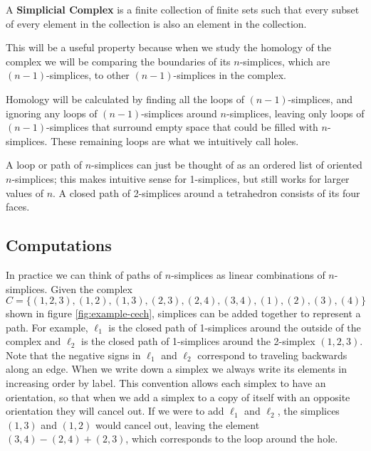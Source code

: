 \begin{definition}\label{def:simplicial-complex}
    A \textbf{Simplicial Complex} is a finite collection of finite sets such that every subset of every element in the collection is also an element in the collection. \cite{wagner}
\end{definition}

This will be a useful property because when we study the homology of the complex we will be comparing the boundaries of its \(n\)-simplices, which are \((n-1)\)-simplices, to other \((n-1)\)-simplices in the complex.

Homology will be calculated by finding all the loops of \((n-1)\)-simplices, and ignoring any loops of \((n-1)\)-simplices around \(n\)-simplices, leaving only loops of \((n-1)\)-simplices that surround empty space that could be filled with \(n\)-simplices.
These remaining loops are what we intuitively call holes.

A loop or path of \(n\)-simplices can just be thought of as an ordered list of oriented \(n\)-simplices; this makes intuitive sense for 1-simplices, but still works for larger values of \(n\).
A closed path of 2-simplices around a tetrahedron consists of its four faces.

\subsection{Computations}

In practice we can think of paths of \(n\)-simplices as linear combinations of \(n\)-simplices.
Given the complex \(C = \{ (1,2,3), (1,2), (1,3), (2,3), (2,4), (3,4), (1), (2), (3), (4) \}\) shown in figure \ref{fig:example-cech}, simplices can be added together to represent a path.
For example, \(\ell_1\) is the closed path of 1-simplices around the outside of the complex and \(\ell_2\) is the closed path of 1-simplices around the 2-simplex \((1,2,3)\).
Note that the negative signs in \(\ell_1\) and \(\ell_2\) correspond to traveling backwards along an edge.
When we write down a simplex we always write its elements in increasing order by label.
This convention allows each simplex to have an orientation, so that when we add a simplex to a copy of itself with an opposite orientation they will cancel out.
If we were to add \(\ell_1\) and \(\ell_2\), the simplices \((1, 3)\) and \((1, 2)\) would cancel out, leaving the element \((3, 4) - (2, 4) + (2, 3)\), which corresponds to the loop around the hole.

